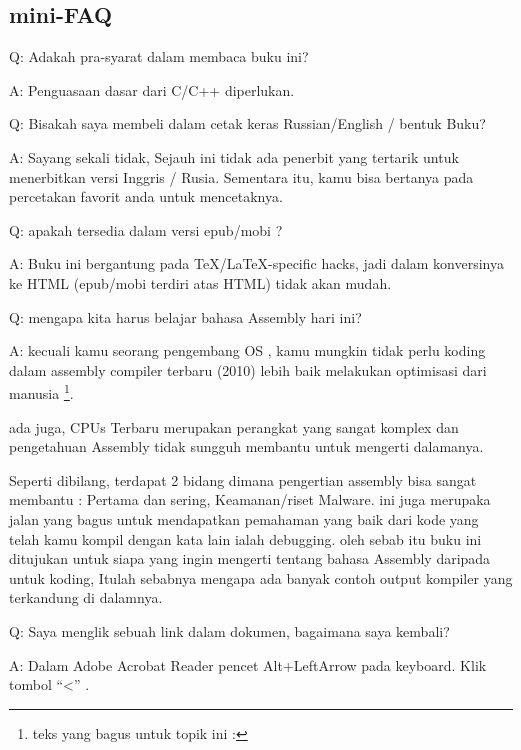 \subsection*{mini-FAQ}


\par Q: Adakah pra-syarat dalam membaca buku ini?
\par A: Penguasaan dasar dari  C/C++ diperlukan.

\par Q: Bisakah saya membeli dalam cetak keras Russian/English / bentuk Buku?
\par A: Sayang sekali tidak, Sejauh ini tidak ada penerbit yang tertarik untuk menerbitkan versi Inggris / Rusia.
Sementara itu, kamu bisa bertanya pada percetakan favorit anda untuk mencetaknya.

\par Q: apakah tersedia dalam versi epub/mobi ?
\par A: Buku ini bergantung pada TeX/LaTeX-specific hacks, jadi dalam konversinya ke HTML (epub/mobi terdiri atas HTML)
tidak akan mudah.

\par Q: mengapa kita harus belajar bahasa Assembly hari ini?
\par A: kecuali kamu seorang pengembang \ac{OS} , kamu mungkin tidak perlu koding dalam assembly\textemdash{} compiler terbaru (2010) lebih baik melakukan optimisasi dari manusia \footnote{teks yang bagus untuk topik ini : \InSqBrackets{\AgnerFog}}.

ada juga, \ac{CPU}s Terbaru merupakan perangkat yang sangat komplex dan pengetahuan Assembly tidak sungguh membantu untuk mengerti dalamanya.

Seperti dibilang, terdapat 2 bidang dimana pengertian assembly bisa sangat membantu : 
Pertama dan sering, Keamanan/riset Malware. ini juga merupaka jalan yang bagus untuk mendapatkan pemahaman yang baik dari kode yang telah kamu kompil dengan kata lain ialah debugging.
oleh sebab itu buku ini ditujukan untuk siapa yang ingin mengerti tentang bahasa Assembly daripada 
untuk koding, Itulah sebabnya mengapa ada banyak contoh output kompiler yang terkandung di dalamnya.

\par Q: Saya menglik sebuah link dalam dokumen, bagaimana saya kembali?
\par A: Dalam Adobe Acrobat Reader pencet Alt+LeftArrow pada keyboard. Klik tombol ``<'' .

